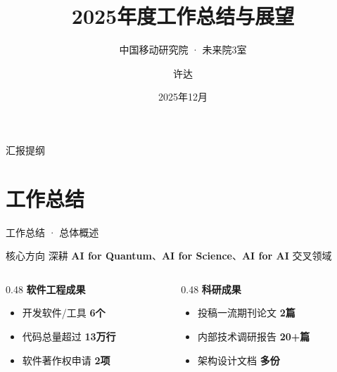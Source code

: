 \documentclass[aspectratio=169,11pt]{beamer}
\title[年终总结]{\textbf{2025年度工作总结与展望}}
\subtitle{中国移动研究院 · 未来院3室}
\author{许达}
\date{2025年12月}
\institute{中国移动研究院}
\begin{document}
\begin{frame}
    \titlepage
\end{frame}

\begin{frame}{汇报提纲}
    \tableofcontents
\end{frame}

\section{工作总结}

\begin{frame}{工作总结 · 总体概述}
    \begin{block}{核心方向}
        深耕 \textbf{AI for Quantum}、\textbf{AI for Science}、\textbf{AI for AI} 交叉领域
    \end{block}
    
    \vspace{0.3cm}
    
    \begin{columns}[T]
        \begin{column}{0.48\textwidth}
            \textbf{软件工程成果}
            \begin{itemize}
                \item 开发软件/工具 \textbf{6个}
                \item 代码总量超过 \textbf{13万行}
                \item 软件著作权申请 \textbf{2项}
            \end{itemize}
        \end{column}
        \begin{column}{0.48\textwidth}
            \textbf{科研成果}
            \begin{itemize}
                \item 投稿一流期刊论文 \textbf{2篇}
                \item 内部技术调研报告 \textbf{20+篇}
                \item 架构设计文档 \textbf{多份}
            \end{itemize}
        \end{column}
    \end{columns}
\end{frame}

\end{document}
